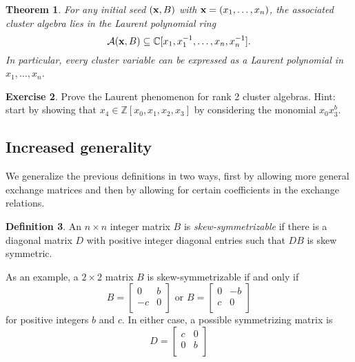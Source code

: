 \documentclass{amsart}
\newtheorem{theorem}{Theorem}[section]
\theoremstyle{definition}
\newtheorem{definition}[theorem]{Definition}
\newtheorem{exercise}[theorem]{Exercise}
\theoremstyle{remark}
\numberwithin{equation}{section}
\newcommand{\cA}{{\mathcal{A}}}
\newcommand{\x}{{\bf x}}
\newcommand{\CC}{{\mathbb{C}}}
\newcommand{\ZZ}{{\mathbb{Z}}}
\begin{document}
	\begin{theorem}\label{th:Laurent phenomenon}
		For any initial seed $(\x,B)$ with $\x = (x_1,\ldots, x_n)$, the associated cluster algebra lies in the Laurent polynomial ring
		\begin{displaymath}
			\cA(\x,B) \subseteq \CC[x_1, x_1^{-1}, \ldots, x_n, x_n^{-1}].
		\end{displaymath}
		In particular, every cluster variable can be expressed as a Laurent polynomial in $x_1,\ldots, x_n$.
	\end{theorem}

  \begin{exercise}
    Prove the Laurent phenomenon for rank 2 cluster algebras.  Hint: start by showing that $x_4\in\ZZ[x_0,x_1,x_2,x_3]$ by considering the monomial $x_0x_3^b$.
  \end{exercise}
	
	\subsection{Increased generality}
	We generalize the previous definitions in two ways, first by allowing more general exchange matrices and then by allowing for certain coefficients in the exchange relations.
	
	\begin{definition}
		An $n \times n$ integer matrix $B$ is \emph{skew-symmetrizable} if there is a diagonal matrix $D$ with positive integer diagonal entries such that $DB$ is skew symmetric.
	\end{definition}
	
	As an example, a $2 \times 2$ matrix $B$ is skew-symmetrizable if and only if
	\begin{displaymath}
		B = \left[ \begin{array}{cc} 	0 & b \\	-c & 0 \\	\end{array}	\right]
		\textrm{ or } B = \left[ \begin{array}{cc} 	0 & -b \\	c & 0 \\	\end{array}	\right]
	\end{displaymath}
	for positive integers $b$ and $c$.  In either case, a possible symmetrizing matrix is
	\begin{displaymath}
		D = \left[ \begin{array}{cc} 	c & 0 \\	0 & b \\	\end{array}	\right]
	\end{displaymath}
	
\end{document}
